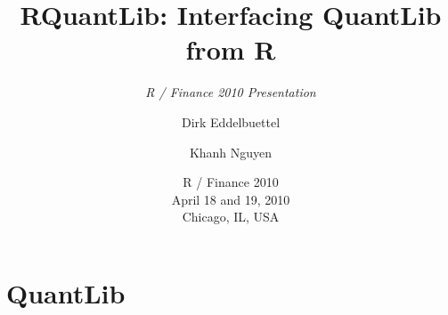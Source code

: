 \documentclass[compress]{beamer}
\title[RQuantLib]{RQuantLib: Interfacing QuantLib from R}  %
\subtitle{\textsl{R / Finance 2010 Presentation}}
\author[Eddelbuettel \and Nguyen]{Dirk Eddelbuettel\inst{1} \and Khanh Nguyen\inst{2}}
\institute[Debian and UMASS]{
  \inst{1}%
  Debian Project
  \and 
  \inst{2}
  UMASS at Boston
}
\date[R / Finance 2010]{R / Finance 2010 \\ April 18 and 19, 2010 \\ Chicago, IL, USA}
\begin{document}
\begin{frame}
  \titlepage
\end{frame}

\section{QuantLib}
\end{document}
